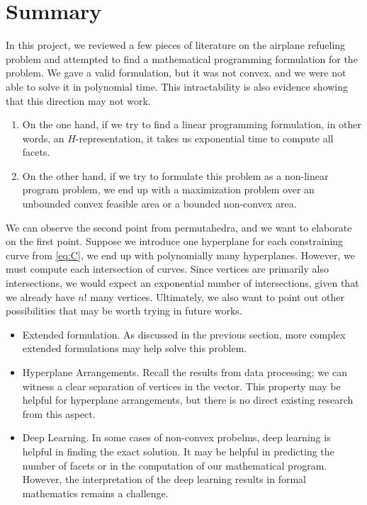 \documentclass[12pt,letterpaper]{article}
\begin{document}
\section{Summary}
In this project, we reviewed a few pieces of literature on the airplane refueling problem and 
attempted to find a mathematical programming formulation for the problem. 
We gave a valid formulation, but it was not convex, and we were not able to solve it in polynomial time. 
This intractability is also evidence showing that this direction may not work.
\begin{enumerate}
    \item On the one hand, if we try to find a linear programming formulation, in other words, an $H$-representation, 
 it takes us exponential time to compute all facets. 
    \item On the other hand, if we try to formulate this problem as a non-linear program problem, we end up 
 with a maximization problem over an unbounded convex feasible area or a bounded non-convex area. 
\end{enumerate}
We can observe the second point from permutahedra, and we want to elaborate on the first point. 
Suppose we introduce one hyperplane for each constraining curve from \ref{eq:C}, we end up with polynomially many hyperplanes. 
However, we must compute each intersection of curves. Since vertices are primarily also intersections, 
we would expect an exponential number of intersections, given that we already have $n!$ many vertices. 
Ultimately, we also want to point out other possibilities that may be worth trying in future works.
\begin{itemize}
    \item Extended formulation. As discussed in the previous section, more complex extended formulations may help solve this 
 problem. 
    \item Hyperplane Arrangements. Recall the results from data processing; we can witness a clear separation of vertices in the vector. 
 This property may be helpful for hyperplane arrangements, but there is no direct existing research from this aspect. 
    \item Deep Learning. In some cases of non-convex probelms, deep learning is helpful in finding the exact solution. 
    It may be helpful in predicting the number of facets or in the  computation of our mathematical program. 
    However, the interpretation of the deep learning results in formal mathematics remains a challenge. 
\end{itemize}



\end{document}
